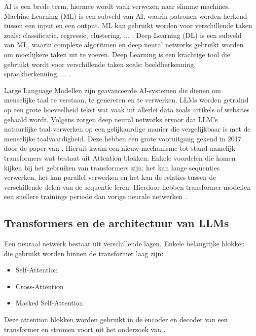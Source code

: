 AI is een brede term, hiermee wordt vaak verwezen naar slimme machines. 
Machine Learning (ML) is een subveld van AI, waarin patronen worden herkend tussen een input en een output.
ML kan gebruikt worden voor verschillende taken zoals: classificatie, regressie, clustering, ... .
Deep Learning (DL) is een subveld van ML, waarin complexe algoritmen en deep neural networks gebruikt worden om moeilijkere taken uit te voeren.
Deep Learning is een krachtige tool die gebruikt wordt voor verschillende taken zoals: beeldherkenning, spraakherkenning, ... \autocite{Stoeffelbauer2023}.

Large Language Modellen zijn geavanceerde AI-systemen die dienen om menselijke taal te verstaan, te genereren en te verwerken.
LLMs worden getraind op een grote hoeveelheid tekst wat vaak uit allerlei data zoals artikels of websites gehaald wordt. 
Volgens \textcite{Beelen2023} zorgen deep neural networks ervoor dat LLM's natuurlijke taal verwerken op een gelijkaardige manier die vergelijkbaar is met de menselijke taalvaardigheid.
Deze hebben een grote vooruitgang gekend in 2017 door de paper van \textcite{VaswaniEtAl2017}. 
Hieruit kwam een nieuw mechanisme tot stand namelijk transformers wat bestaat uit Attention blokken. 
Enkele voordelen die komen kijken bij het gebruiken van transformers zijn: het kan lange sequenties verwerken, het kan parallel verwerken en het kan de relaties tussen de verschillende delen van de sequentie leren.
Hierdoor hebben transformer modellen een snellere trainings periode dan vorige neurale netwerken \autocite{aiml2023}.

\subsection{Transformers en de architectuur van LLMs}
\label{sec:architectuur-van-llms}
Een neuraal netwerk bestaat uit verschillende lagen. Enkele belangrijke blokken die gebruikt worden binnen de transformer laag zijn:
\begin{itemize}
  \item Self-Attention
  \item Cross-Attention
  \item Masked Self-Attention
\end{itemize}

Deze attention blokken worden gebruikt in de encoder en decoder van een transformer en stromen voort uit het onderzoek van \textcite{VaswaniEtAl2017}.

